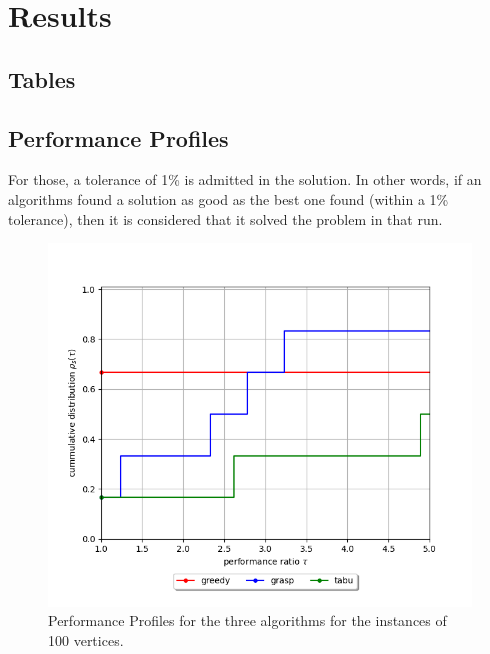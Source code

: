 \section{Results}

\subsection{Tables}





\subsection{Performance Profiles}

For those, a tolerance of 1\% is admitted in the solution. In other words, if an algorithms found a solution as good as the best one found (within a 1\% tolerance), then it is considered that it solved the problem in that run.

\begin{figure}
    \centering
    \includegraphics[width=\textwidth]{images/performance_profile/100_thmax_5.0.png}
    \caption{Performance Profiles for the three algorithms for the instances of 100 vertices.}
    \label{fig:perf-100}
\end{figure}


